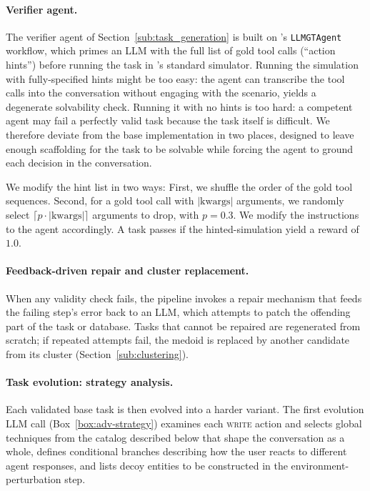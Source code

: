 \paragraph{Verifier agent.}
The verifier agent of Section~\ref{sub:task_generation} is built on \taubench's \texttt{LLMGTAgent} workflow, which primes an LLM with the full list of gold tool calls (``action hints'') before running the task in \taubench's standard simulator. Running the simulation with fully-specified hints might be too easy: the agent can transcribe the tool calls into the conversation without engaging with the scenario, yields a degenerate solvability check. Running it with no hints is too hard: a competent agent may fail a perfectly valid task because the task itself is difficult. We therefore deviate from the base implementation in two places, designed to leave enough scaffolding for the task to be solvable while forcing the agent to ground each decision in the conversation.

We modify the hint list in two ways: First, we shuffle the order of the gold tool sequences. Second, for a gold tool call with  $|\text{kwargs}|$ arguments, we randomly select $\lceil p \cdot |\text{kwargs}|\rceil$ arguments to drop, with $p=0.3$. We modify the instructions to the agent accordingly. A task passes if the hinted-simulation yield a reward of $1.0$.

\paragraph{Feedback-driven repair and cluster replacement.}
When any validity check fails, the pipeline invokes a repair mechanism that feeds the failing step's error back to an LLM, which attempts to patch the offending part of the task or database. Tasks that cannot be repaired are regenerated from scratch; if repeated attempts fail, the medoid is replaced by another candidate from its cluster (Section~\ref{sub:clustering}).

\paragraph{Task evolution: strategy analysis.}
Each validated base task is then evolved into a harder variant. The first evolution LLM call (Box~\ref{box:adv-strategy}) examines each \textsc{write} action and selects global techniques from the catalog described below that shape the conversation as a whole, defines conditional branches describing how the user reacts to different agent responses, and lists decoy entities to be constructed in the environment-perturbation step.

